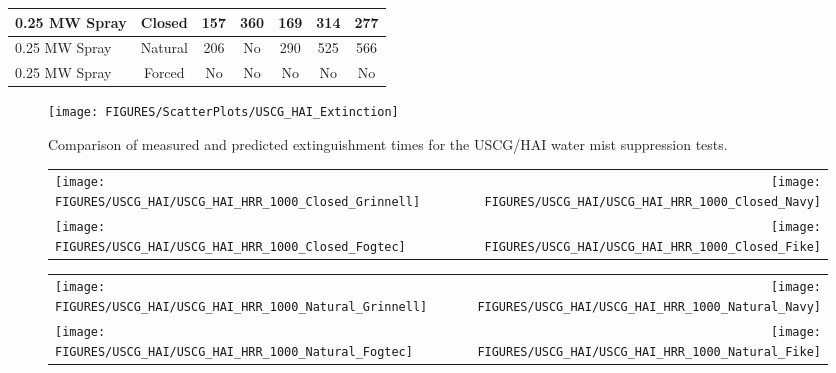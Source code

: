 \begin{table}[h!]
\begin{center}
\begin{tabular}{|l|c|c|c|c|c|c|}
0.25 MW Spray       & Closed                            & 157   & 360       & 169       & 314       & 277    \\ \hline
0.25 MW Spray       & Natural                           & 206   & No        & 290       & 525       & 566    \\ \hline
0.25 MW Spray       & Forced                            & No    & No        & No        & No        & No     \\ \hline
\end{tabular}
\end{center}
\label{USCG_HAI_Times}
\end{table}

\begin{figure}[h!]
\begin{center}
\texttt{[image: FIGURES/ScatterPlots/USCG\_HAI\_Extinction]}
\caption[Comparison of measured and predicted extinguishment times for the USCG/HAI water mist suppression tests.]{Comparison of measured and predicted extinguishment times for the USCG/HAI water mist suppression tests.}
\label{USCG_Scatter}
\end{center}
\end{figure}




\begin{figure}[p]
\begin{tabular*}{\textwidth}{l@{\extracolsep{\fill}}r}
\texttt{[image: FIGURES/USCG\_HAI/USCG\_HAI\_HRR\_1000\_Closed\_Grinnell]} &
\texttt{[image: FIGURES/USCG\_HAI/USCG\_HAI\_HRR\_1000\_Closed\_Navy]} \\
\texttt{[image: FIGURES/USCG\_HAI/USCG\_HAI\_HRR\_1000\_Closed\_Fogtec]} &
\texttt{[image: FIGURES/USCG\_HAI/USCG\_HAI\_HRR\_1000\_Closed\_Fike]}
\end{tabular*}
\label{USCG_HAI_1}
\end{figure}

\begin{figure}[p]
\begin{tabular*}{\textwidth}{l@{\extracolsep{\fill}}r}
\texttt{[image: FIGURES/USCG\_HAI/USCG\_HAI\_HRR\_1000\_Natural\_Grinnell]} &
\texttt{[image: FIGURES/USCG\_HAI/USCG\_HAI\_HRR\_1000\_Natural\_Navy]} \\
\texttt{[image: FIGURES/USCG\_HAI/USCG\_HAI\_HRR\_1000\_Natural\_Fogtec]} &
\texttt{[image: FIGURES/USCG\_HAI/USCG\_HAI\_HRR\_1000\_Natural\_Fike]}
\end{tabular*}
\label{USCG_HAI_2}
\end{figure}

